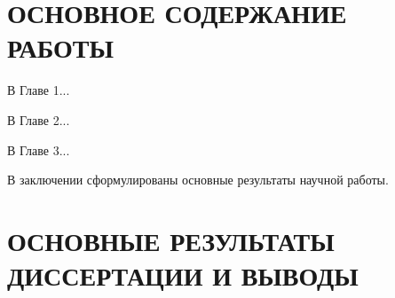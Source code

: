 \newcommand{\reliability}{\pdfbookmark[1]{Достоверность}{reliability}\paragraph{Достоверность результатов.}}
\newcommand{\probation}{\pdfbookmark[1]{Апробация}{probation}\paragraph{Апробация работы.}}
\newcommand{\contribution}{\pdfbookmark[1]{Вклад}{contribution}\paragraph{Личный вклад автора.}}
\newcommand{\publications}{\pdfbookmark[1]{Публикации}{publications}\paragraph{Публикации по теме диссертации.}}




\section*{ОСНОВНОЕ СОДЕРЖАНИЕ РАБОТЫ}

В Главе 1...

В Главе 2...

В Главе 3...

В заключении сформулированы основные результаты научной работы.


\section*{ОСНОВНЫЕ РЕЗУЛЬТАТЫ ДИССЕРТАЦИИ И ВЫВОДЫ}


